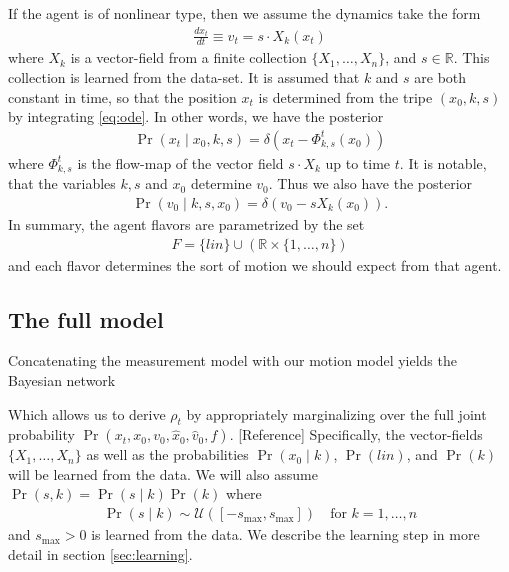 \documentclass[conference]{IEEEtran}
\begin{document}
If the agent is of nonlinear type, then we assume the dynamics take the form
\begin{align}
	\frac{dx_t}{dt} \equiv v_t = s \cdot X_k(x_t) \label{eq:ode}
\end{align}
where $X_k$ is a vector-field from a finite collection $\{X_1, \dots, X_n\}$, and $s \in \mathbb{R}$.
This collection is learned from the data-set.
It is assumed that $k$ and $s$ are both constant in time, so that the position $x_t$ is determined from the
tripe $(x_0,k,s)$ by integrating \eqref{eq:ode}.
In other words, we have the posterior
\begin{align*}
	\Pr( x_t \mid x_0 , k , s) = \delta( x_t - \Phi^{t}_{k,s}(x_0) )
\end{align*}
where $\Phi^{t}_{k,s}$ is the flow-map of the vector field $s \cdot X_k$ up to time $t$.
It is notable, that the variables $k,s$ and $x_0$ determine $v_0$.
Thus we also have the posterior
\begin{align*}
	\Pr( v_0 \mid k,s,x_0) = \delta( v_0 -s X_k(x_0) ).
\end{align*}
In summary, the agent flavors are parametrized by the set
\begin{align*}
	F = \{ lin \} \cup \left( \mathbb{R} \times \{ 1 , \dots, n \} \right)
\end{align*}
and each flavor determines the sort of motion we should expect from that agent.

\subsection{The full model}
Concatenating the measurement model with our motion model yields the Bayesian network
\begin{center}
\end{center}
Which allows us to derive $\rho_t$ by appropriately marginalizing over the full joint probability $\Pr(x_t, x_0, v_0, \hat{x}_0, \hat{v}_0, f)$. [Reference]
Specifically, the vector-fields $\{X_1,\dots,X_n\}$ as well as the probabilities $\Pr( x_0 \mid k )$, $\Pr(lin)$, and $\Pr( k )$ will be learned from the data.
We will also assume $\Pr(s,k) = \Pr(s \mid k ) \Pr(k)$ where 
\begin{align*}
	\Pr(s \mid k ) \sim \mathcal{U}([-s_{\max}, s_{\max} ] ) \quad \text{for } k=1,\dots,n
\end{align*}
and $s_{\max} > 0$ is learned from the data.
We describe the learning step in more detail in section \ref{sec:learning}.
\end{document}
